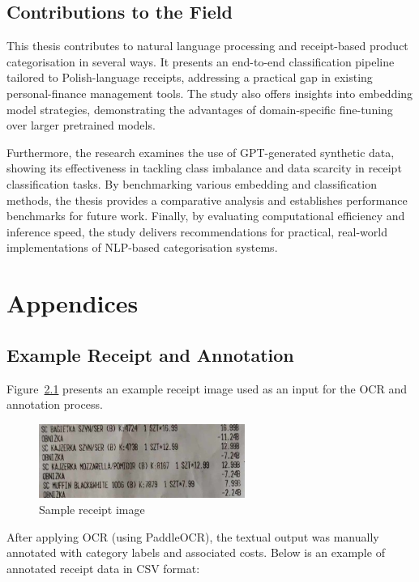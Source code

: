\documentclass{SGGW-thesis-EN}
\begin{document}
\section{Contributions to the Field}
This thesis contributes to natural language processing and receipt-based product categorisation in several ways.
It presents an end-to-end classification pipeline tailored to Polish-language receipts, addressing a practical gap
in existing personal-finance management tools. The study also offers insights into embedding model strategies,
demonstrating the advantages of domain-specific fine-tuning over larger pretrained models.

Furthermore, the research examines the use of GPT-generated synthetic data, showing its effectiveness in tackling
class imbalance and data scarcity in receipt classification tasks. By benchmarking various embedding and classification methods, the
thesis provides a comparative analysis and establishes performance benchmarks for future work. Finally, by
evaluating computational efficiency and inference speed, the study delivers recommendations for practical,
real-world implementations of NLP-based categorisation systems.


\chapter{Appendices}

\section{Example Receipt and Annotation}

Figure~\ref{fig:sample_receipt} presents an example receipt image used as an input for the OCR and annotation process.

\begin{figure}[h]
    \centering
    \includegraphics[width=0.6\textwidth]{images/sample_receipt.jpg}
    \caption{Sample receipt image}
    \label{fig:sample_receipt}
\end{figure}

After applying OCR (using PaddleOCR), the textual output was manually annotated with category labels and associated costs.
Below is an example of annotated receipt data in CSV format:
\end{document}
